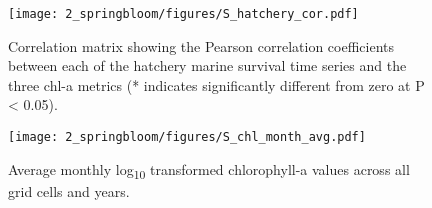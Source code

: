 \begin{figure}[htbp]
  \centering
  \texttt{[image: 2\_springbloom/figures/S\_hatchery\_cor.pdf]}
  \caption[Correlation matrix between each of the hatchery marine survival time 
    series and the three chl-a metrics ]{Correlation matrix showing the Pearson
    correlation coefficients between each of the hatchery marine survival time
    series and the three chl-a metrics (* indicates significantly different from
    zero at P \textless{} 0.05).}
  \label{fig:bloom:s4}
\end{figure}

\begin{figure}[htbp]
  \centering
  \texttt{[image: 2\_springbloom/figures/S\_chl\_month\_avg.pdf]}
  \caption[Average monthly log\textsubscript{10} transformed chlorophyll-a
    values across all grid cells and years.]{Average monthly
    log\textsubscript{10} transformed chlorophyll-a values across all grid cells
    and years.}
  \label{fig:bloom:s5}
\end{figure}



